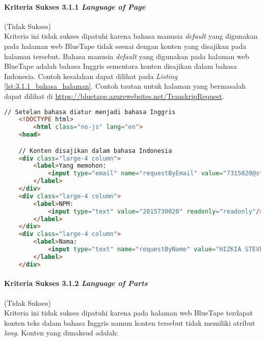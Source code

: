 \paragraph{Kriteria Sukses 3.1.1 \textit{Language of Page}}
\label{par:kepatuhan_bluetape_kriteria_sukses_3.1.1}
(Tidak Sukses)\\

Kriteria ini tidak sukses dipatuhi karena bahasa manusia \textit{default} yang digunakan pada halaman web BlueTape tidak sesuai dengan konten yang disajikan pada halaman tersebut. Bahasa manusia \textit{default} yang digunakan pada halaman web BlueTape adalah bahasa Inggris sementara konten disajikan dalam bahasa Indonesia. Contoh kesalahan dapat dilihat pada \textit{Listing} \ref{lst:3.1.1_bahasa_halaman}. Contoh tautan untuk halaman yang bermasalah dapat dilihat di \url{https://bluetape.azurewebsites.net/TranskripRequest}.

\begin{lstlisting}[frame=single, label={lst:3.1.1_bahasa_halaman}, language=HTML, caption=Pelanggaran Kriteria Sukses 3.1.1 pada Halaman Cetak Transkrip]
    // Setelan bahasa diatur menjadi bahasa Inggris
    <!DOCTYPE html>
        <html class="no-js" lang="en">
    <head>

    // Konten disajikan dalam bahasa Indonesia
    <div class="large-4 column">
        <label>Yang memohon:
            <input type="email" name="requestByEmail" value="7315020@student.unpar.ac.id" readonly="readonly"/>
        </label>
    </div>
    <div class="large-4 column">
        <label>NPM:
            <input type="text" value="2015730020" readonly="readonly"/>
        </label>
    </div>
    <div class="large-4 column">
        <label>Nama:
            <input type="text" name="requestByName" value="HIZKIA STEVEN" readonly="readonly"/>
        </label>
    </div>
\end{lstlisting}

\paragraph{Kriteria Sukses 3.1.2 \textit{Language of Parts}}
\label{par:kepatuhan_bluetape_kriteria_sukses_3.1.2}
(Tidak Sukses)\\

Kriteria ini tidak sukses dipatuhi karena pada halaman web BlueTape terdapat konten teks dalam bahasa Inggris namun konten tersebut tidak memiliki atribut \textit{lang}. Konten yang dimaksud adalah:

